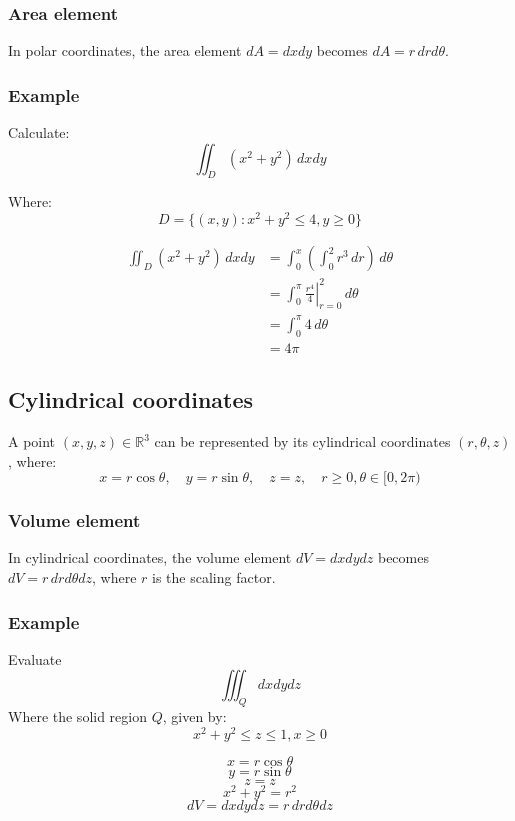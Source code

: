 \documentclass[11pt]{article}
\begin{document}
\subsubsection{Area element}
\label{sec:org96542bd}
In polar coordinates, the area element \(dA = dx dy\) becomes \(dA = r \, dr d \theta\).

\subsubsection{Example}
\label{sec:org0784866}
Calculate:
\[\iint_D (x^2 + y^2) \, dx dy\]

Where:
\[D = \{(x, y) : x^2 + y^2 \le 4, y \ge 0\}\]

\begin{align*}
\iint_D (x^2 + y^2) \, dx dy &= \int_0^x \left( \int_0^2 r^3 \, dr \right) \, d \theta \\
&= \int_0^\pi \left. \frac{r^4}{4} \right|_{r = 0}^2 \, d \theta \\
&= \int_0^\pi 4 \, d \theta \\
&= 4 \pi
\end{align*}

\newpage

\subsection{Cylindrical coordinates}
\label{sec:org658329c}
A point \((x, y, z) \in \mathbb{R}^3\) can be represented by its cylindrical coordinates \((r, \theta, z)\), where:
\[x = r \cos \theta, \quad y = r \sin \theta, \quad z = z, \quad r \ge 0, \theta \in [0, 2\pi)\]

\subsubsection{Volume element}
\label{sec:org0450af5}
In cylindrical coordinates, the volume element \(dV = dx dy dz\) becomes \(dV = r \, dr d\theta dz\), where \(r\) is the scaling factor.

\subsubsection{Example}
\label{sec:org9498729}
Evaluate
\[\iiint_Q dx dy dz\]
Where the solid region \(Q\), given by:
\[x^2 + y^2 \le z \le 1, x \ge 0\]

\[x = r \cos \theta\]
\[y = r \sin \theta\]
\[z = z\]
\[x^2 + y^2 = r^2\]
\[dV = dx dy dz = r \, dr d \theta dz\]
\end{document}
